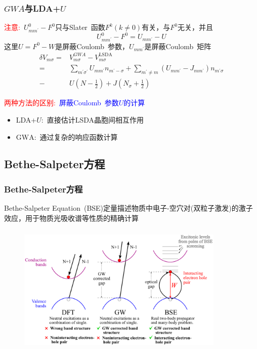 \frame
{
	\frametitle{$GWA$与\textrm{LDA+}$U$}
	\textcolor{red}{注意:~}$U_{mm^{\prime}}^0-F^0$只与\textrm{Slater~}函数$F^k(k\neq0)$有关，与$F^0$无关，并且
	\begin{displaymath}
		U_{mm^{\prime}}^0-F^0=U_{mm^{\prime}}-U
	\end{displaymath}
	这里$U=F^0-W$是屏蔽\textrm{Coulomb~}参数，$U_{mm^{\prime}}$是屏蔽\textrm{Coulomb~}矩阵
	\begin{displaymath}
		\begin{aligned}
			\delta V_{m\sigma}=&V_{m\sigma}^{GWA}-V_{m\sigma}^{\mathrm{LSDA}}\\
			=&\sum_{m^{\prime}\sigma^{\prime}}U_{mm^{\prime}}n_{m^{\prime}-\sigma}+\sum_{m^{\prime}\neq m}(U_{mm^{\prime}}-J_{mm^{\prime}})n_{m^{\prime}\sigma}\\
			-&U(N-\frac12)+J(N_{\sigma}+\frac12)
		\end{aligned}
	\end{displaymath}

	\textcolor{red}{两种方法的区别:~}\textcolor{blue}{屏蔽\textrm{Coulomb~}参数$U$的计算}
	\begin{itemize}
		\item \textrm{LDA+}$U$:~直接估计\textrm{LSDA}晶胞间相互作用
		\item $\mathrm{GWA}$:~通过复杂的响应函数计算
	\end{itemize}
}

\subsection{\rm{Bethe-Salpeter}方程}
\frame
{
	\frametitle{\textrm{Bethe-Salpeter}方程}
	\textrm{Bethe-Salpeter Equation~(BSE)}定量描述物质中电子-空穴对(双粒子激发)的激子效应，用于物质光吸收谱等性质的精确计算
\begin{figure}[h!]
\centering
\vspace{-5pt}
\includegraphics[height=2.45in,width=3.90in,viewport=0 0 1000 600,clip]{Figures/BSE_GW_DFT.png}
\label{GW-BSE_GW_DFT}
\end{figure}
}

